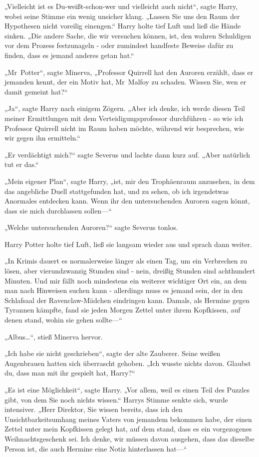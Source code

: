 {„Vielleicht ist es Du-weißt-schon-wer und vielleicht auch nicht“, sagte Harry, wobei seine Stimme ein wenig unsicher klang. „Lassen Sie uns den Raum der Hypothesen nicht voreilig einengen.“ Harry holte tief Luft und ließ die Hände sinken. „Die andere Sache, die wir versuchen können, ist, den wahren Schuldigen vor dem Prozess festzunageln - oder zumindest handfeste Beweise dafür zu finden, dass es jemand anderes getan hat.“

„Mr~Potter“, sagte Minerva, „Professor Quirrell hat den Auroren erzählt, dass er jemanden kennt, der ein Motiv hat, Mr~Malfoy zu schaden. Wissen Sie, wen er damit gemeint hat?“

„Ja“, sagte Harry nach einigem Zögern. „Aber ich denke, ich werde diesen Teil meiner Ermittlungen mit dem Verteidigungsprofessor durchführen - so wie ich Professor Quirrell nicht im Raum haben möchte, während wir besprechen, wie wir gegen ihn ermitteln.“

„Er verdächtigt mich?“ sagte Severus und lachte dann kurz auf. „Aber natürlich tut er das.“

„Mein eigener Plan“, sagte Harry, „ist, mir den Trophäenraum anzusehen, in dem das angebliche Duell stattgefunden hat, und zu sehen, ob ich irgendetwas Anormales entdecken kann. Wenn ihr den untersuchenden Auroren sagen könnt, dass sie mich durchlassen sollen—“

„Welche untersuchenden Auroren?“ sagte Severus tonlos.

Harry Potter holte tief Luft, ließ sie langsam wieder aus und sprach dann weiter.

„In Krimis dauert es normalerweise länger als einen Tag, um ein Verbrechen zu lösen, aber vierundzwanzig Stunden sind - nein, dreißig Stunden sind achthundert Minuten. Und mir fällt noch mindestens ein weiterer wichtiger Ort ein, an dem man nach Hinweisen suchen kann - allerdings muss es jemand sein, der in den Schlafsaal der Ravenclaw-Mädchen eindringen kann. Damals, als Hermine gegen Tyrannen kämpfte, fand sie jeden Morgen Zettel unter ihrem Kopfkissen, auf denen stand, wohin sie gehen sollte—“

„Albus…“, stieß Minerva hervor.

„Ich habe sie nicht geschrieben“, sagte der alte Zauberer. Seine weißen Augenbrauen hatten sich überrascht gehoben. „Ich wusste nichts davon. Glaubst du, dass man mit ihr gespielt hat, Harry?“

„Es ist eine Möglichkeit“, sagte Harry. „Vor allem, weil es einen Teil des Puzzles gibt, von dem Sie noch nichts wissen.“ Harrys Stimme senkte sich, wurde intensiver. „Herr Direktor, Sie wissen bereits, dass ich den Unsichtbarkeitsumhang meines Vaters von jemandem bekommen habe, der einen Zettel unter mein Kopfkissen gelegt hat, auf dem stand, dass es ein vorgezogenes Weihnachtsgeschenk sei. Ich denke, wir müssen davon ausgehen, dass das dieselbe Person ist, die auch Hermine eine Notiz hinterlassen hat—“

}
